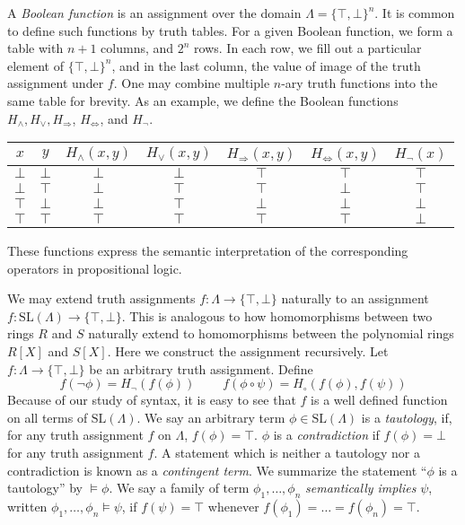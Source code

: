 \begin{example}
    A \emph{Boolean function} is an assignment over the domain $\Lambda = \{ \top, \bot \}^n$. It is common to define such functions by truth tables. For a given Boolean function, we form a table with $n + 1$ columns, and $2^{n}$ rows. In each row, we fill out a particular element of $\{ \top, \bot \}^n$, and in the last column, the value of image of the truth assignment under $f$. One may combine multiple $n$-ary truth functions into the same table for brevity. As an example, we define the Boolean functions $H_\wedge, H_\vee, H_\Rightarrow$, $H_{\Leftrightarrow}$, and $H_\neg$.
    \begin{center}
    \begin{tabular}{| c | c | c | c | c | c | c |}
        \hline $x$ & $y$ & $H_\wedge(x,y)$ & $H_\vee(x,y)$ & $H_\Rightarrow(x,y)$ & $H_\Leftrightarrow(x,y)$ & $H_\neg(x)$ \\
        \hline $\bot$ & $\bot$ & $\bot$ & $\bot$ & $\top$ & $\top$ & $\top$ \\
        $\bot$ & $\top$ & $\bot$ & $\top$ & $\top$ & $\bot$ & $\top$ \\
        $\top$ & $\bot$ & $\bot$ & $\top$ & $\bot$ & $\bot$ & $\bot$ \\
        $\top$ & $\top$ & $\top$ & $\top$ & $\top$ & $\top$ & $\bot$ \\
        \hline
    \end{tabular}
    \end{center}
    These functions express the semantic interpretation of the corresponding operators in propositional logic.
\end{example}

We may extend truth assignments $f: \Lambda \to \{ \top, \bot \}$ naturally to an assignment $f: \text{SL}(\Lambda) \to \{ \top, \bot \}$. This is analogous to how homomorphisms between two rings $R$ and $S$ naturally extend to homomorphisms between the polynomial rings $R[X]$ and $S[X]$. Here we construct the assignment recursively. Let $f: \Lambda \to \{ \top, \bot \}$ be an arbitrary truth assignment. Define
%
\[ f(\neg \phi) = H_\neg(f(\phi))\ \ \ \ \ \ \ \ \ \ f(\phi \circ \psi) = H_\circ(f(\phi), f(\psi)) \]
%
Because of our study of syntax, it is easy to see that $f$ is a well defined function on all terms of $\text{SL}(\Lambda)$. We say an arbitrary term $\phi \in \text{SL}(\Lambda)$ is a \emph{tautology}, if, for any truth assignment $f$ on $\Lambda$, $f(\phi) = \top$. $\phi$ is a \emph{contradiction} if $f(\phi) = \bot$ for any truth assignment $f$. A statement which is neither a tautology nor a contradiction is known as a \emph{contingent term}. We summarize the statement ``$\phi$ is a tautology'' by $\vDash \phi$. We say a family of term $\phi_1, \dots, \phi_n$ \emph{semantically implies} $\psi$, written $\phi_1, \dots, \phi_n \vDash \psi$, if $f(\psi) = \top$ whenever $f(\phi_1) = \dots = f(\phi_n) = \top$.

